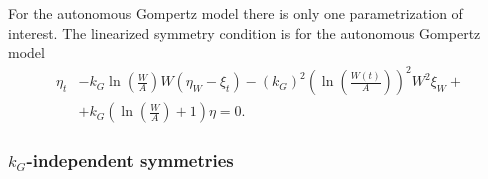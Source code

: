 For the autonomous Gompertz model there is only one parametrization of interest.
The linearized symmetry condition  is for the autonomous Gompertz model
\begin{equation}\label{eq:gompertz-autonomous-lin-symmetry-cond}
  \begin{split}
    \eta_t &- k_G \ln(\frac{W}{A}) W\left(\eta_W - \xi_t\right) - (k_G)^2 \left(\ln(\frac{W(t)}{A})\right)^2 W^2 \xi_W +\\ &+ k_G \left(\ln(\frac{W}{A}) + 1\right) \eta = 0.
  \end{split}
\end{equation}

\subsubsection{\texorpdfstring{\(k_G\)-independent symmetries}{Growth rate-independent symmetries}}

